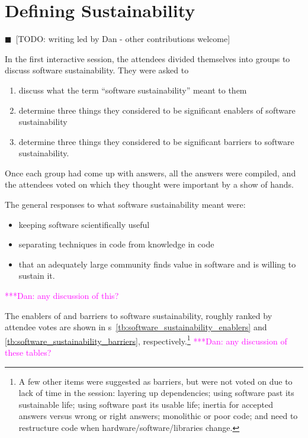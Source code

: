 \documentclass[11pt, oneside]{amsart}
\newcommand{\todo}[1]{{\color{blue}$\blacksquare$~\textsf{[TODO: #1]}}}
\newcommand{\katznote}[1]{ {\textcolor{magenta}    { ***Dan:      #1 }}}
\begin{document}
\smallskip

\section{Defining Sustainability} \label{sec:defining}

\todo{writing led by Dan - other contributions welcome}

In the first interactive session, the attendees divided themselves into groups
to discuss software sustainability. They were asked to
\begin{enumerate}
\item discuss what the term ``software sustainability'' meant to them

\item determine three things they considered to be significant enablers of
software sustainability

\item determine three things they considered to be significant barriers to
software sustainability.
\end{enumerate}
Once each group had come up with answers, all the answers were compiled, and the
attendees voted on which they thought were important by a show of hands.

The general responses to what software sustainability meant were:
\begin{itemize}
\item keeping software scientifically useful
\item separating techniques in code from knowledge in code
\item that an adequately large community finds value in software and is willing
to sustain it.
\end{itemize}
\katznote{any discussion of this?}

The enablers of and barriers to software sustainability, roughly ranked by
attendee votes are shown in
{\tablename}s~\ref{tb:software_sustainability_enablers} and
\ref{tb:software_sustainability_barriers}, respectively.\footnote{A few other
items were suggested as barriers, but were not voted on due to lack of time in
the session:
layering up dependencies;
using software past its sustainable life;
using software past its usable life;
inertia for accepted answers versus wrong or right answers;
monolithic or poor code; and
need to restructure code when hardware/software/libraries change.
}
\katznote{any discussion of these tables?}
\end{document}
